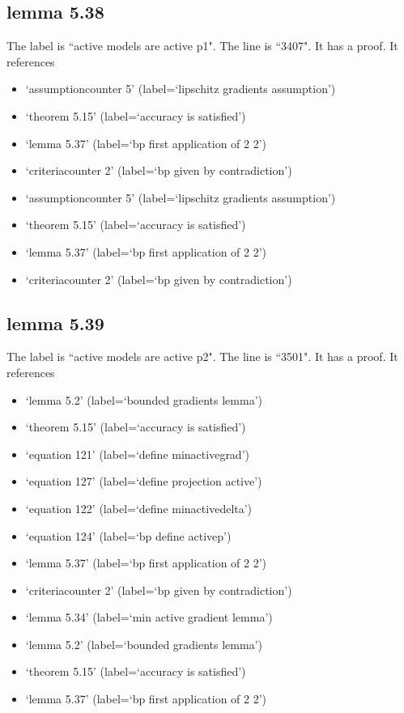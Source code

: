 \documentclass{article}
\begin{document}
\subsection{lemma 5.38}
The label is ``active models are active p1".
The line is ``3407".
It has a proof.
It references \begin{itemize}
\item `assumptioncounter 5' (label=`lipschitz gradients assumption')
\item `theorem 5.15' (label=`accuracy is satisfied')
\item `lemma 5.37' (label=`bp first application of 2 2')
\item `criteriacounter 2' (label=`bp given by contradiction')
\item `assumptioncounter 5' (label=`lipschitz gradients assumption')
\item `theorem 5.15' (label=`accuracy is satisfied')
\item `lemma 5.37' (label=`bp first application of 2 2')
\item `criteriacounter 2' (label=`bp given by contradiction')
\end{itemize}
\subsection{lemma 5.39}
The label is ``active models are active p2".
The line is ``3501".
It has a proof.
It references \begin{itemize}
\item `lemma 5.2' (label=`bounded gradients lemma')
\item `theorem 5.15' (label=`accuracy is satisfied')
\item `equation 121' (label=`define minactivegrad')
\item `equation 127' (label=`define projection active')
\item `equation 122' (label=`define minactivedelta')
\item `equation 124' (label=`bp define activep')
\item `lemma 5.37' (label=`bp first application of 2 2')
\item `criteriacounter 2' (label=`bp given by contradiction')
\item `lemma 5.34' (label=`min active gradient lemma')
\item `lemma 5.2' (label=`bounded gradients lemma')
\item `theorem 5.15' (label=`accuracy is satisfied')
\item `lemma 5.37' (label=`bp first application of 2 2')
\end{itemize}
\end{document}
